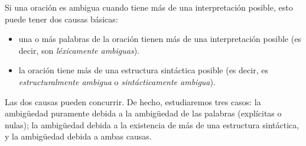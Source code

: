 Si una oración es ambigua cuando tiene más de una interpretación posible, esto puede tener dos causas básicas: \begin{itemize} \item una o más palabras de la oración tienen más de una interpretación posible (es decir, son \emph{léxicamente ambiguas}). \item la oración tiene más de una estructura sintáctica posible (es decir, es \emph{estructuralmente ambigua} o \emph{sintácticamente ambigua}). \end{itemize} Las dos causas pueden concurrir. De hecho, estudiaremos tres casos: la ambigüedad puramente debida a la ambigüedad de las palabras (explícitas o nulas); la ambigüedad debida a la existencia de más de una estructura sintáctica, y la ambigüedad debida a ambas causas. 

